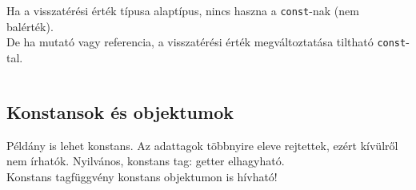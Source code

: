 \documentclass[usenames,dvipsnames,aspectratio=169]{beamer}
\begin{document}
\begin{frame}
    Ha a visszatérési érték típusa alaptípus, nincs haszna a \texttt{const}-nak (nem balérték). \\
    De ha mutató vagy referencia, a visszatérési érték megváltoztatása tiltható \texttt{const}-tal.
    \begin{columns}[T]
        \begin{column}{0.45\textwidth}
            \begin{exampleblock}{}
                \small
                
            \end{exampleblock}
        \end{column}
        \begin{column}{0.45\textwidth}
            \begin{exampleblock}{}
                \small
                
            \end{exampleblock}
        \end{column}
    \end{columns}
\end{frame}

\begin{frame}
    \begin{exampleblock}{}
        \small
        
        
    \end{exampleblock}
\end{frame}

\subsection{Konstansok és objektumok}

\begin{frame}
    Példány is lehet konstans. Az adattagok többnyire eleve rejtettek, ezért kívülről nem írhatók. Nyilvános, konstans tag: getter elhagyható.\\
    Konstans tagfüggvény konstans objektumon is hívható!
    \begin{exampleblock}{}
        \small
        
    \end{exampleblock}
\end{frame}
\end{document}
